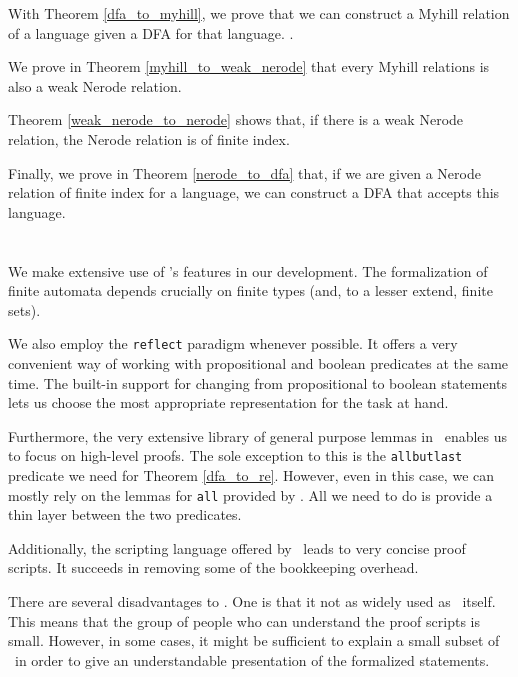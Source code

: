 With Theorem \ref{dfa_to_myhill}, we prove that we can construct a Myhill relation of a language given a DFA for that language.
.

We prove in Theorem \ref{myhill_to_weak_nerode} that every Myhill relations is also a weak Nerode relation.

Theorem \ref{weak_nerode_to_nerode} shows that, if there is a weak Nerode relation, the Nerode relation is of finite index.

Finally, we prove in Theorem \ref{nerode_to_dfa} that, if we are given a Nerode relation of finite index for a language, we can construct a DFA that accepts this language.

\section{\ssreflect}
We make extensive use of \ssreflect's features in our development.
The formalization of finite automata depends crucially on finite types (and, to a lesser extend, finite sets).

We also employ the \lstinline{reflect} paradigm whenever possible.
It offers a very convenient way of working with propositional and boolean predicates at the same time.
The built-in support for changing from propositional to boolean statements lets us choose the most appropriate representation for the task at hand.


Furthermore, the very extensive library of general purpose lemmas in \ssreflect\ enables us to focus on high-level proofs. 
The sole exception to this is the \lstinline{allbutlast} predicate we need for Theorem \ref{dfa_to_re}.
However, even in this case, we can mostly rely on the lemmas for \lstinline{all} provided by \ssreflect.
All we need to do is provide a thin layer between the two predicates.

Additionally, the scripting language offered by \ssreflect\ leads to very concise proof scripts. 
It succeeds in removing some of the bookkeeping overhead. %

There are several disadvantages to \ssreflect. 
One is that it not as widely used as \coq\ itself. 
This means that the group of people who can understand the 
proof scripts is small.
However, in some cases, it might be sufficient to explain a small subset of
\ssreflect\ in order to give an understandable presentation of the formalized statements. 

